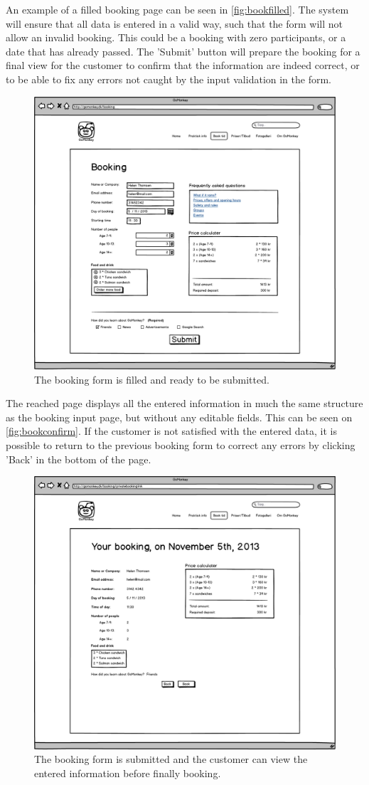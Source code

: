 An example of a filled booking page can be seen in \autoref{fig:bookfilled}. 
The system will ensure that all data is entered in a valid way, such that the form
will not allow an invalid booking. This could be a booking with zero
participants, or a date that has already passed. The
'Submit' button will prepare the booking for a final view for the customer to 
confirm that the information are indeed correct, or to be able to fix any errors 
not caught by the input validation in the form.

\begin{figure}[htbp]
    \centering
        \includegraphics[width=.6\textwidth]{figures/mockup/booking_filled.png}
	    \caption{The booking form is filled and ready to be submitted.}
        \label{fig:bookfilled}
\end{figure}



The reached page displays all the entered information in much the same structure as 
the booking input page, but 
without any editable fields. This can be seen on \autoref{fig:bookconfirm}. If the 
customer is not satisfied with the entered data, it is possible to return to the 
previous booking form to correct any errors by clicking 'Back' in the bottom of the page. 

\begin{figure}[htbp]
    \centering
        \includegraphics[width=.6\textwidth]{figures/mockup/booking_confirmation.png}
	    \caption{The booking form is submitted and the customer can view the entered information before finally booking.}
        \label{fig:bookconfirm}
\end{figure}



